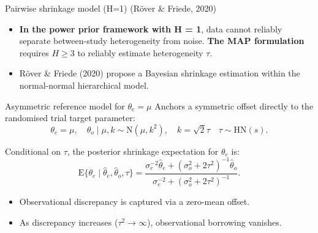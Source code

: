 \documentclass[t]{beamer}
\newcommand{\E}{\mathrm{E}}
\begin{document}
\begin{frame}{Pairwise shrinkage model (H=1) (R\"over \& Friede, 2020)}
    \begin{itemize}
    \item \textbf{In the power prior framework with H = 1}, data cannot reliably separate between-study heterogeneity from noise. \textbf{The MAP formulation} requires $H \ge 3$ to reliably estimate heterogeneity $\tau$.
    \item R\"over \& Friede (2020) propose a Bayesian shrinkage estimation within the normal-normal hierarchical model.
    \end{itemize}

    \begin{block}{Asymmetric reference model for $\theta_e = \mu$}
    Anchors a symmetric offset directly to the randomised trial target parameter:
    \begin{equation*}
        \theta_e = \mu, \quad \theta_o \mid \mu, k \sim \text{N}(\mu, k^2), \quad k =\sqrt{2}\tau \quad \tau \sim \text{HN}(s).
    \end{equation*}
    \end{block}

    Conditional on $\tau$, the posterior shrinkage expectation for $\theta_e$ is:
    \begin{equation*}
        \E\{\theta_e \mid \hat\theta_e, \hat\theta_o, \tau\} = \frac{\sigma_e^{-2} \hat\theta_e + (\sigma_o^2 + 2\tau^2)^{-1} \hat\theta_o}{\sigma_e^{-2} + (\sigma_o^2 + 2\tau^2)^{-1}}.
    \end{equation*}

    \begin{itemize}
        \item Observational discrepancy is captured via a zero-mean offset.
        \item As discrepancy increases ($\tau^2 \to \infty$), observational borrowing vanishes.
    \end{itemize}
\end{frame}
\end{document}
